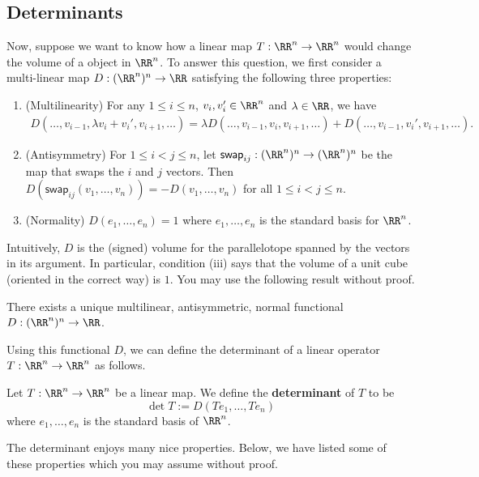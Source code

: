 \documentclass[11pt]{article}
\begin{document}
\subsection{Determinants}

Now, suppose we want to know how a linear map $T : \RR^n \to \RR^n$ would change the volume of a object in $\RR^n$. To answer this question, we first consider a multi-linear map $D : (\RR^n)^n \to \RR$ satisfying the following three properties:
\begin{enumerate}[label = (\roman*)]
    \item (Multilinearity) For any $1 \leq i \leq n$, $v_i, v_i' \in \RR^n$ and $\lambda \in \RR$, we have 
    \begin{align*}
        D(\ldots, v_{i-1}, \lambda v_i + v_i', v_{i+1}, \ldots) = \lambda D(\ldots, v_{i-1}, v_i, v_{i+1}, \ldots ) + D(\ldots, v_{i-1}, v_i', v_{i+1}, \ldots).
    \end{align*}
    \item (Antisymmetry) For $1 \leq i < j \leq n$, let $\mathsf{swap}_{ij} : (\RR^n)^n \to (\RR^n)^n$ be the map that swaps the $i$ and $j$ vectors. Then $D(\mathsf{swap}_{ij}(v_1, \ldots, v_n)) = -D(v_1, \ldots, v_n)$ for all $1 \leq i < j \leq n$. 
    \item (Normality) $D(e_1, \ldots, e_n) = 1$ where $e_1, \ldots, e_n$ is the standard basis for $\RR^n$.
\end{enumerate}

Intuitively, $D$ is the (signed) volume for the parallelotope spanned by the vectors in its argument. In particular, condition (iii) says that the volume of a unit cube (oriented in the correct way) is $1$. You may use the following result without proof. 
\begin{thm}
    There exists a unique multilinear, antisymmetric, normal functional $D : (\RR^n)^n \to \RR$. 
\end{thm}

Using this functional $D$, we can define the determinant of a linear operator $T : \RR^n \to \RR^n$ as follows. 
\begin{defn}
    Let $T : \RR^n \to \RR^n$ be a linear map. We define the \textbf{determinant} of $T$ to be 
    \[
        \det T := D(Te_1, \ldots, Te_n)    
    \]
    where $e_1, \ldots, e_n$ is the standard basis of $\RR^n$. 
\end{defn}

The determinant enjoys many nice properties. Below, we have listed some of these properties which you may assume without proof.
\end{document}
